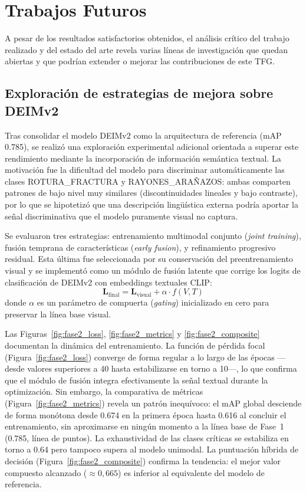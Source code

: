 \section{Trabajos Futuros}
\label{sec:trabajos_futuro}

A pesar de los resultados satisfactorios obtenidos, el análisis crítico del trabajo realizado y del estado del arte revela varias líneas de investigación que quedan abiertas y que podrían extender o mejorar las contribuciones de este TFG.

\subsection{Exploración de estrategias de mejora sobre DEIMv2}

Tras consolidar el modelo DEIMv2 como la arquitectura de referencia (mAP 0.785), se realizó una exploración experimental adicional orientada a superar este rendimiento mediante la incorporación de información semántica textual. La motivación fue la dificultad del modelo para discriminar automáticamente las clases \mbox{ROTURA\_FRACTURA} y \mbox{RAYONES\_ARAÑAZOS}: ambas comparten patrones de bajo nivel muy similares (discontinuidades lineales y bajo contraste), por lo que se hipotetizó que una descripción lingüística externa podría aportar la señal discriminativa que el modelo puramente visual no captura.

Se evaluaron tres estrategias: entrenamiento multimodal conjunto (\textit{joint training}), fusión temprana de características (\textit{early fusion}), y refinamiento progresivo residual. Esta última fue seleccionada por su conservación del preentrenamiento visual y se implementó como un módulo de fusión latente que corrige los logits de clasificación de DEIMv2 con embeddings textuales CLIP:
\[
\mathbf{L}_\text{final} = \mathbf{L}_\text{visual} + \alpha \cdot f(V, T)
\]
donde $\alpha$ es un parámetro de compuerta (\textit{gating}) inicializado en cero para preservar la línea base visual.

Las Figuras~\ref{fig:fase2_loss}, \ref{fig:fase2_metrics} y \ref{fig:fase2_composite} documentan la dinámica del entrenamiento. La función de pérdida focal (Figura~\ref{fig:fase2_loss}) converge de forma regular a lo largo de las épocas ---desde valores superiores a 40 hasta estabilizarse en torno a 10---, lo que confirma que el módulo de fusión integra efectivamente la señal textual durante la optimización. Sin embargo, la comparativa de métricas (Figura~\ref{fig:fase2_metrics}) revela un patrón inequívoco: el mAP global desciende de forma monótona desde 0.674 en la primera época hasta 0.616 al concluir el entrenamiento, sin aproximarse en ningún momento a la línea base de Fase~1 (0.785, línea de puntos). La exhaustividad de las clases críticas se estabiliza en torno a 0.64 pero tampoco supera al modelo unimodal. La puntuación híbrida de decisión (Figura~\ref{fig:fase2_composite}) confirma la tendencia: el mejor valor compuesto alcanzado ($\approx 0{,}665$) es inferior al equivalente del modelo de referencia.

